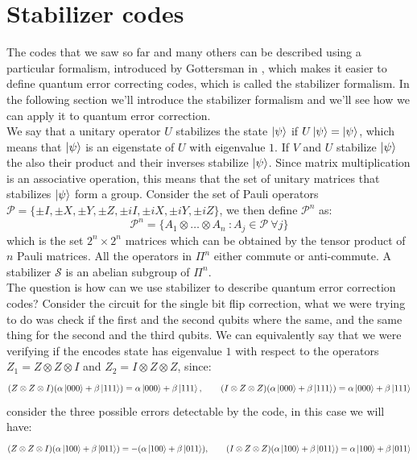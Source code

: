 \documentclass{article}
\begin{document}
	\section{Stabilizer codes}
	The codes that we saw so far and many others can be described using a particular formalism, introduced by Gottersman in \cite{Gottesman1997StabilizerCA}, which makes it easier to define quantum error correcting codes, which is called the stabilizer formalism. In the following section we'll introduce the stabilizer formalism and we'll see how we can apply it to quantum error correction.\\
	We say that a unitary operator $U$ stabilizes the state $\ket{\psi}$ if $U\ket{\psi} = \ket{\psi}$, which means that $\ket{\psi}$ is an eigenstate of $U$ with eigenvalue $1$. If $V$ and $U$ stabilize $\ket{\psi}$ the also their product and their inverses stabilize $\ket{\psi}$. Since matrix multiplication is an associative operation, this means that the set of unitary matrices that stabilizes $\ket{\psi}$ form a group. 	 Consider the set of Pauli operators $\mathcal{P} = \{\pm I,\pm X,\pm Y,\pm Z, \pm iI,\pm iX,\pm iY,\pm iZ\}$, we then define $\mathcal{P}^n$ as:
	\[\mathcal{P}^n = \{A_1\otimes \dots \otimes A_n\ \colon A_j \in \mathcal{P}\ \forall j\}\]
	which is the set $2^n\times2^n$ matrices which can be obtained by the tensor product of $n$ Pauli matrices. All the operators in $\Pi^n$ either commute or anti-commute. A stabilizer $\mathcal{S}$ is an abelian subgroup of $\Pi^n$.\\
	The question is how can we use stabilizer to describe quantum error correction codes? Consider the circuit for the single bit flip correction, what we were trying to do was check if the first and the second qubits where the same, and the same thing for the second and the third qubits. We can equivalently say that we were verifying if the encodes state has eigenvalue $1$ with respect to the operators $Z_1 = Z\otimes Z \otimes I$ and $Z_2 = I \otimes Z \otimes Z$, since:
	\[(Z\otimes Z \otimes I)(\alpha\ket{000} + \beta\ket{111}) = \alpha\ket{000} + \beta\ket{111},\qquad (I\otimes Z \otimes Z)(\alpha\ket{000} + \beta\ket{111}) = \alpha\ket{000} + \beta\ket{111}\]
	consider the three possible errors detectable by the code, in this case we will have:
	\[(Z\otimes Z \otimes I)(\alpha\ket{100} + \beta\ket{011}) = -(\alpha\ket{100} + \beta\ket{011}),\qquad (I\otimes Z \otimes Z)(\alpha\ket{100} + \beta\ket{011}) = \alpha\ket{100} + \beta\ket{011}\]
\end{document}
